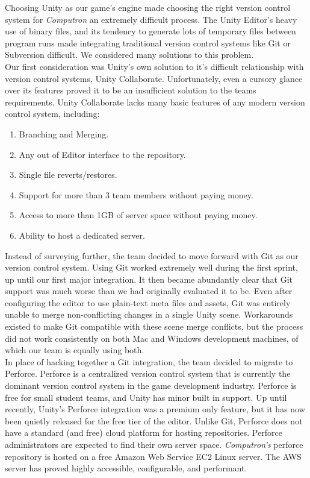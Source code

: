Choosing Unity as our game's engine made choosing the right version control system 
for \textit{Computron} an extremely difficult process. The Unity Editor's heavy use of 
binary files, and its tendency to generate lots of temporary files between program runs 
made integrating traditional version control systems like Git or Subversion difficult. We 
considered many solutions to this problem.\\

Our first consideration was Unity's own solution to it's difficult relationship with version 
control systems, Unity Collaborate. Unfortunately, even a cursory glance over its 
features proved it to be an insufficient solution to the teams requirements. Unity Collaborate 
lacks many basic features of any modern version control system, including: 
\begin{enumerate}
	\item Branching and Merging.
	\item Any out of Editor interface to the repository.
	\item Single file reverts/restores.
	\item Support for more than 3 team members without paying money.
	\item Access to more than 1GB of server space without paying money.
	\item Ability to host a dedicated server.
\end{enumerate}


Instead of surveying further, the team decided to move forward with Git as our version 
control system. Using Git worked extremely well during the first sprint, up until our first 
major integration. It then became abundantly clear that Git support was much worse than 
we had originally evaluated it to be. Even after configuring the editor to use plain-text meta 
files and assets, Git was entirely unable to merge non-conflicting changes in a single Unity 
scene. Workarounds existed to make Git compatible with these scene merge conflicts, but 
the process did not work consistently on both Mac and Windows development machines, 
of which our team is equally using both.\\

In place of hacking together a Git integration, the team decided to migrate to Perforce. 
Perforce is a centralized version control system that is currently the dominant version control 
system in the game development industry. Perforce is free for small student teams, and Unity has minor 
built in support. Up until recently, Unity's Perforce integration was a premium only feature, 
but it has now been quietly released for the free tier of the editor. Unlike Git, Perforce does 
not have a standard (and free) cloud platform for hosting repositories. Perforce administrators 
are expected to find their own server space. \textit{Computron's} perforce repository is hosted 
on a free Amazon Web Service EC2 Linux server. The AWS server has proved highly accessible, 
configurable, and performant. \\

